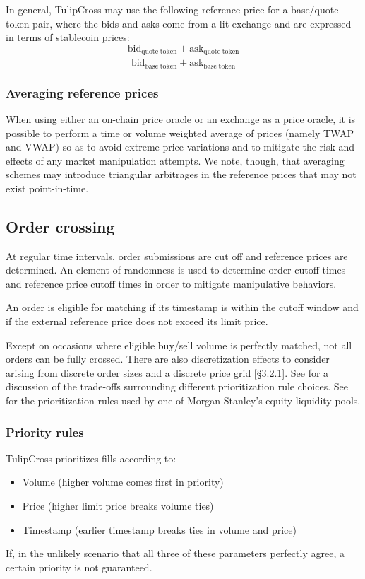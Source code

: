 \documentclass[11pt, reqno]{amsart}
\theoremstyle{definition}
\theoremstyle{remark}
\newcommand{\bidbase}{\mathrm{bid}_\mathrm{quote\;token}}
\newcommand{\askbase}{\mathrm{ask}_\mathrm{quote\;token}}
\newcommand{\bidquote}{\mathrm{bid}_\mathrm{base\;token}}
\newcommand{\askquote}{\mathrm{ask}_\mathrm{base\;token}}
\begin{document}
In general, TulipCross may use the following reference price for a base/quote
token pair, where the bids and asks come from a lit exchange and are expressed
in terms of stablecoin prices:
\begin{equation}
    \frac{\bidbase + \askbase}{\bidquote + \askquote}
\end{equation}

\subsubsection{Averaging reference prices}
When using either an on-chain price oracle or an exchange as a price oracle,
it is possible to perform a time or volume weighted average of prices (namely
TWAP and VWAP) so as to avoid extreme price variations and to mitigate the risk
and effects of any market manipulation attempts. We note, though, that
averaging schemes may introduce triangular arbitrages in the reference prices
that may not exist point-in-time.

\subsection{Order crossing}
At regular time intervals, order submissions are cut off and reference prices
are determined. An element of randomness is used to determine order cutoff
times and reference price cutoff times in order to
mitigate manipulative behaviors.

An order is eligible for matching if its timestamp is within the cutoff window
and if the external reference price does not exceed its limit price.

Except on occasions where eligible buy/sell volume is perfectly matched, not
all orders can be fully crossed. There are also discretization effects to
consider arising from discrete order sizes and a discrete price grid
\cite{BoBoDoGo18}[\S 3.2.1].
See \cite{BeLaLiVa22} for a discussion of the trade-offs surrounding
different prioritization rule choices. See \cite{MsAts} for the
prioritization rules used by one of Morgan Stanley's equity liquidity pools.

\subsubsection{Priority rules}
TulipCross prioritizes fills according to:
\begin{itemize}
    \item Volume (higher volume comes first in priority)
    \item Price (higher limit price breaks volume ties)
    \item Timestamp (earlier timestamp breaks ties in volume and price)
\end{itemize}
If, in the unlikely scenario that all three of these parameters perfectly
agree, a certain priority is not guaranteed.
\end{document}
